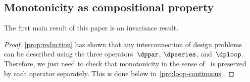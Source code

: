 \subsection{Monotonicity as compositional property\label{sec:Monotone-Co-Design-Problems}}

The first main result of this paper is an invariance result.



\noindent
{}

\begin{proof}
\cref{prop:reduction} has shown that any interconnection of design
problems can be described using the three operators~$\dppar$, $\dpseries$,
and~$\dploop$. Therefore, we just need to check that monotonicity
in the sense of~ is preserved by each operator
separately. This is done below in~\textendash \ref{pro:loop-continuous}.
\end{proof}

